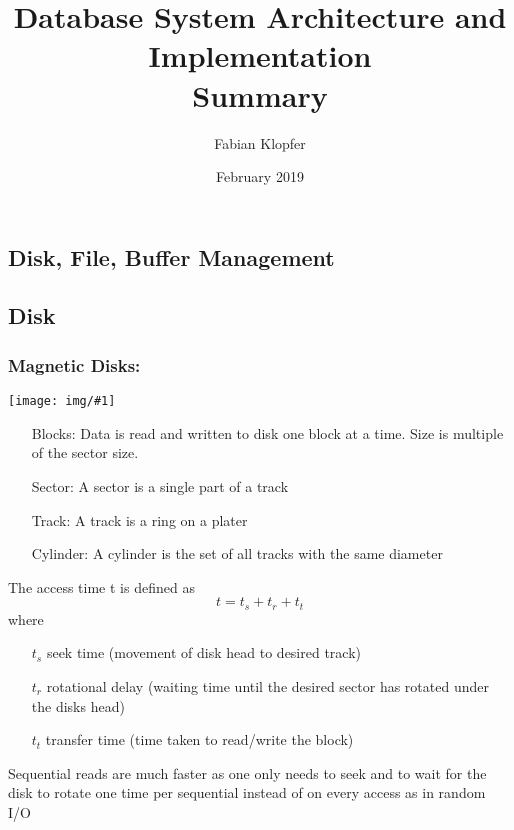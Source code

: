 \documentclass[a4paper]{article}
\title{Database System Architecture and Implementation \\
Summary}
\author{Fabian Klopfer}
\date{February 2019}
\newcommand{\img}[1]{\begin{center}
    \texttt{[image: img/\#1]}
\end{center} }
\begin{document}
\begin{twocolumn}
\section{Disk, File, Buffer Management}
\subsection{Disk}
\subsubsection{Magnetic Disks:}
\img{magnetic_disk.png}
\begin{enumerate}
	\item[Blocks:] Data is read and written to disk one block at a time. Size is multiple of the sector size.
	\item[Sector:] A sector is a single part of a track
	\item[Track:] A track is a ring on a plater
	\item[Cylinder:] A cylinder is the set of all tracks with the same diameter
\end{enumerate}
The access time t is defined as \[ t = t_s + t_r + t_t \]
where \begin{itemize}
	\item[$t_s$] seek time (movement of disk head to desired track)
	\item[$t_r$] rotational delay (waiting time until the desired sector has rotated under the disks head)
	\item[$t_t$] transfer time (time taken to read/write the block) 
\end{itemize}
Sequential reads are much faster as one only needs to seek and to wait for the disk to rotate one time per sequential instead of on every access as in random I/O \\


\end{twocolumn}
\end{document}
